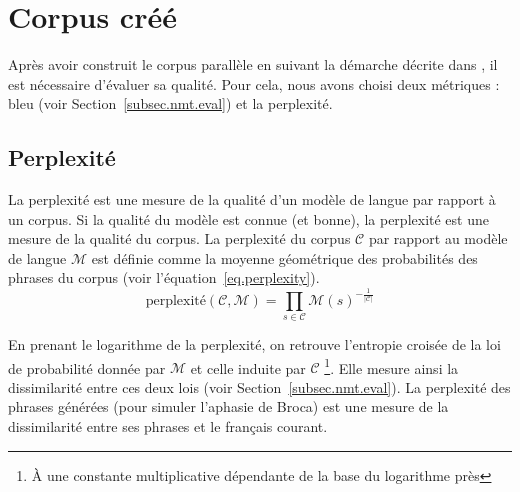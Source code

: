 \section{Corpus créé}%
\label{sec.results.corpus}

Après avoir construit le corpus parallèle en suivant la démarche décrite dans 
,
il est nécessaire d'évaluer sa qualité.
Pour cela, nous avons choisi deux métriques : \gls{bleu} (voir Section~\ref{subsec.nmt.eval})
et la perplexité.

\subsection{Perplexité}%
\label{subsec.results.corpus.perplexity}

La perplexité est une mesure de la qualité d'un modèle de langue par rapport à un corpus.
Si la qualité du modèle est connue (et bonne), la perplexité est une mesure de la qualité du corpus.
La perplexité du corpus \(\mathcal{C}\) par rapport au modèle de langue \(\mathcal{M}\) est définie
comme la moyenne géométrique des probabilités des phrases du corpus (voir l'équation~\ref{eq.perplexity}).
\begin{equation}
  \label{eq.perplexity}
  \text{perplexité}(\mathcal{C}, \mathcal{M}) = 
  \prod_{s\in\mathcal{C}}\mathcal{M}(s)^{-\frac{1}{|\mathcal{C}|}}
\end{equation}

En prenant le logarithme de la perplexité, 
on retrouve l'entropie croisée de la loi de probabilité donnée par \(\mathcal{M}\) 
et celle induite par \(\mathcal{C}\)%
\footnote{À une constante multiplicative dépendante de la base du logarithme près}.
Elle mesure ainsi la dissimilarité entre ces deux lois (voir Section~\ref{subsec.nmt.eval}).
La perplexité des phrases générées (pour simuler l'aphasie de Broca) 
est une mesure de la dissimilarité entre ses phrases et le français courant.


